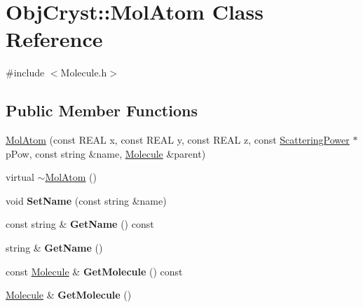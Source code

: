 \hypertarget{class_obj_cryst_1_1_mol_atom}{}\section{Obj\+Cryst\+::Mol\+Atom Class Reference}
\label{class_obj_cryst_1_1_mol_atom}


{\ttfamily \#include $<$Molecule.\+h$>$}

\subsection*{Public Member Functions}
\begin{DoxyCompactItemize}
\item 
\mbox{\hyperlink{class_obj_cryst_1_1_mol_atom_a4a96ce5bd91d7b46e53fe8bbc95fa243}{Mol\+Atom}} (const R\+E\+AL x, const R\+E\+AL y, const R\+E\+AL z, const \mbox{\hyperlink{class_obj_cryst_1_1_scattering_power}{Scattering\+Power}} $\ast$p\+Pow, const string \&name, \mbox{\hyperlink{class_obj_cryst_1_1_molecule}{Molecule}} \&parent)
\item 
virtual \mbox{\hyperlink{class_obj_cryst_1_1_mol_atom_a01d5507db6c5c841af3061af70e3161b}{$\sim$\+Mol\+Atom}} ()
\item 
\mbox{\label{class_obj_cryst_1_1_mol_atom_ac25d454197829303bbc0c6550c7bed1e}} 
void {\bfseries Set\+Name} (const string \&name)
\item 
\mbox{\label{class_obj_cryst_1_1_mol_atom_ab0fc09af694681a0cd9ba51b21a67c82}} 
const string \& {\bfseries Get\+Name} () const
\item 
\mbox{\label{class_obj_cryst_1_1_mol_atom_a3a85a9ea1a6678c1982c139a05dcfee1}} 
string \& {\bfseries Get\+Name} ()
\item 
\mbox{\label{class_obj_cryst_1_1_mol_atom_a88d3035da957b5fe2d7f540c5a7ecc75}} 
const \mbox{\hyperlink{class_obj_cryst_1_1_molecule}{Molecule}} \& {\bfseries Get\+Molecule} () const
\item 
\mbox{\label{class_obj_cryst_1_1_mol_atom_a28456af48d719bab98da4136bb1b1ed9}} 
\mbox{\hyperlink{class_obj_cryst_1_1_molecule}{Molecule}} \& {\bfseries Get\+Molecule} ()
\item 

\end{DoxyCompactItemize}
